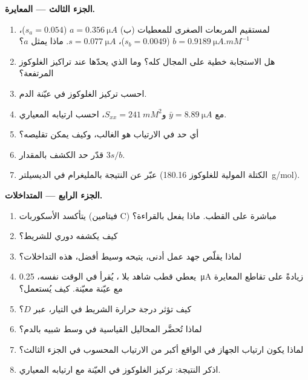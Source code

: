 \begin{problem}
\medskip\noindent\textbf{الجزء الثالث --- المعايرة.}
\begin{enumerate}[resume]
  \item لمستقيم المربعات الصغرى للمعطيات (ب) $a = \qty{0.356}{\micro A}$ ($s_a = 0.054$)، $b =
        \qty{0.9189}{\micro A.mM^{-1}}$ ($s_b = 0.0049$)، $s = \qty{0.077}{\micro A}$. ماذا يمثل $a$؟
  \item هل الاستجابة خطية على المجال كله؟ وما الذي يحدّها عند تراكيز
        الغلوكوز المرتفعة؟
  \item احسب تركيز الغلوكوز في عيّنة الدم.
  \item مع $\bar y = \qty{8.89}{\micro A}$ و$S_{xx} = \qty{241}{mM^2}$، احسب ارتيابه المعياري.
  \item أي حد في الارتياب هو الغالب، وكيف يمكن تقليصه؟
  \item قدّر حد الكشف بالمقدار $3s/b$.
  \item عبّر عن النتيجة بالمليغرام في الديسيلتر (الكتلة المولية للغلوكوز
        \qty{180.16}{g/mol}).
\end{enumerate}

\medskip\noindent\textbf{الجزء الرابع --- المتداخلات.}
\begin{enumerate}[resume]
  \item يتأكسد الأسكوربات (فيتامين C) مباشرة على القطب. ماذا يفعل
        بالقراءة؟
  \item كيف يكشفه  دوري للشريط؟
  \item لماذا يقلّص جهد عمل أدنى، يتيحه وسيط أفضل،
        هذه التداخلات؟
  \item يعطي قطب شاهد بلا ، يُقرأ في الوقت نفسه،
        \qty{0.25}{\micro A} زيادةً على تقاطع المعايرة مع عيّنة معيّنة. كيف
        يُستعمل؟
  \item كيف تؤثر درجة حرارة الشريط في التيار، عبر $D$؟
  \item لماذا تُحضَّر المحاليل القياسية في وسط شبيه بالدم؟
  \item لماذا يكون ارتياب الجهاز في الواقع أكبر من الارتياب
        المحسوب في الجزء الثالث؟
  \item اذكر النتيجة: تركيز الغلوكوز في العيّنة مع
        ارتيابه المعياري.
\end{enumerate}
\end{problem}
